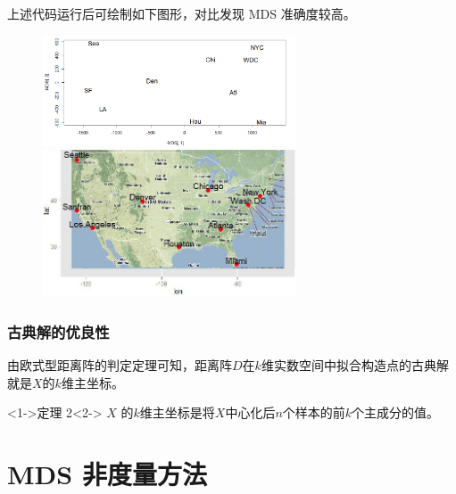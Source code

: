 \documentclass[UTF8, compress]{ctexbeamer}
\begin{document}
	
	\begin{frame}
		\pause
		上述代码运行后可绘制如下图形，对比发现 MDS 准确度较高。
		\vspace{.2cm}
		\pause 
		\begin{figure}
			\centering
			\includegraphics[width=7.5cm]{figures/3}
			\includegraphics[width=7.5cm]{figures/4}
		\end{figure}
		
	\end{frame}
	
	
	
	\begin{frame}
	\frametitle{\heiti 古典解的优良性}
	
		\onslide<1->
		由{欧式型距离阵的判定定理}可知，距离阵$D$在$k$维实数空间中拟合构造点的古典解就是$X$的$k$维主坐标。
		
		\vspace{0.5cm}	
	
		\begin{block}<1->{\heiti 定理 2}<2->
			$X$ 的$k$维主坐标是将$X$中心化后$n$个样本的前$k$个主成分的值。
		\end{block}
	\end{frame}
	
\section{{\sffamily MDS} {\heiti 非度量方法}}

	\frame{\tableofcontents[currentsection]}
	
\end{document}
